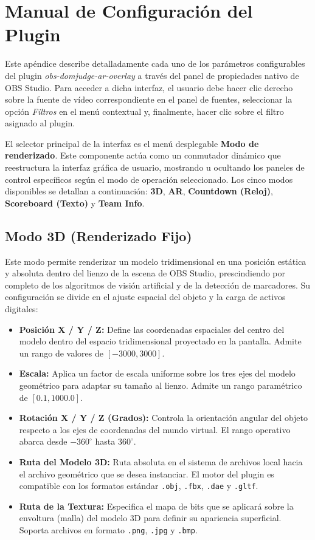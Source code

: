 \chapter{Manual de Configuración del Plugin}
\label{Appendix:Configuracion}

Este apéndice describe detalladamente cada uno de los parámetros configurables del plugin \textit{obs-domjudge-ar-overlay} a través del panel de propiedades nativo de OBS Studio. Para acceder a dicha interfaz, el usuario debe hacer clic derecho sobre la fuente de vídeo correspondiente en el panel de fuentes, seleccionar la opción \textit{Filtros} en el menú contextual y, finalmente, hacer clic sobre el filtro asignado al plugin.

El selector principal de la interfaz es el menú desplegable \textbf{Modo de renderizado}. Este componente actúa como un conmutador dinámico que reestructura la interfaz gráfica de usuario, mostrando u ocultando los paneles de control específicos según el modo de operación seleccionado. Los cinco modos disponibles se detallan a continuación: \textbf{3D}, \textbf{AR}, \textbf{Countdown (Reloj)}, \textbf{Scoreboard (Texto)} y \textbf{Team Info}.

\section{Modo 3D (Renderizado Fijo)}
\label{sec:modo-3d}

Este modo permite renderizar un modelo tridimensional en una posición estática y absoluta dentro del lienzo de la escena de OBS Studio, prescindiendo por completo de los algoritmos de visión artificial y de la detección de marcadores. Su configuración se divide en el ajuste espacial del objeto y la carga de activos digitales:

\begin{itemize}
    \item \textbf{Posición X / Y / Z:} Define las coordenadas espaciales del centro del modelo dentro del espacio tridimensional proyectado en la pantalla. Admite un rango de valores de $[ -3000, 3000 ]$.
    \item \textbf{Escala:} Aplica un factor de escala uniforme sobre los tres ejes del modelo geométrico para adaptar su tamaño al lienzo. Admite un rango paramétrico de $[ 0.1, 1000.0 ]$.
    \item \textbf{Rotación X / Y / Z (Grados):} Controla la orientación angular del objeto respecto a los ejes de coordenadas del mundo virtual. El rango operativo abarca desde $-360^\circ$ hasta $360^\circ$.
    \item \textbf{Ruta del Modelo 3D:} Ruta absoluta en el sistema de archivos local hacia el archivo geométrico que se desea instanciar. El motor del plugin es compatible con los formatos estándar \texttt{.obj}, \texttt{.fbx}, \texttt{.dae} y \texttt{.gltf}.
    \item \textbf{Ruta de la Textura:} Especifica el mapa de bits que se aplicará sobre la envoltura (malla) del modelo 3D para definir su apariencia superficial. Soporta archivos en formato \texttt{.png}, \texttt{.jpg} y \texttt{.bmp}.
\end{itemize}

